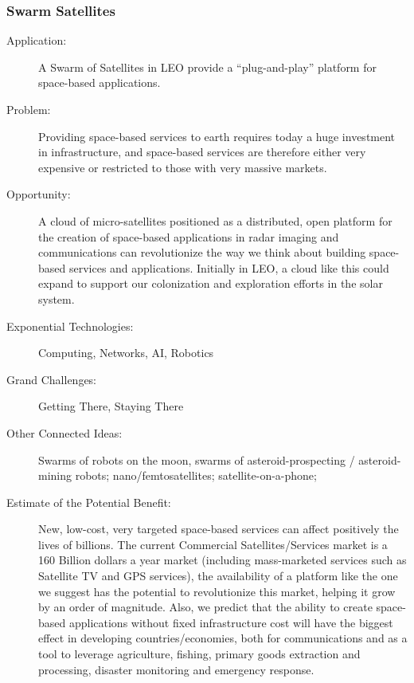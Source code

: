 \subsubsection{Swarm  Satellites}
\label{swarm}
 \begin{description}  \item[Application:] A Swarm of Satellites in \gls{LEO} provide a  ``plug-and-play'' platform for space-based applications.
 
  \item[Problem:] Providing  space-based services to earth requires today a huge investment in  infrastructure, and space-based services are therefore either very  expensive or restricted to those with very massive markets.
 
  \item[Opportunity:] A cloud of  micro-satellites positioned as a distributed, open platform for the  creation of space-based applications in radar imaging and communications can revolutionize the way we think about building space-based services  and applications. Initially in \gls{LEO}, a cloud like this could expand to  support our colonization and exploration efforts in the solar system.
 
  \item[Exponential Technologies:]  Computing, Networks, AI, Robotics
 
  \item[Grand Challenges:] Getting  There, Staying There
 
  \item[Other Connected Ideas:]  Swarms of robots on the moon, swarms of asteroid-prospecting /  asteroid-mining robots; nano/femtosatellites; satellite-on-a-phone;
 
  \item[Estimate of the Potential  Benefit:]New, low-cost, very targeted space-based services can affect  positively the lives of billions. The current Commercial  Satellites/Services market is a 160 Billion dollars a year market  (including mass-marketed services such as Satellite TV and GPS  services), the availability of a platform like the one we suggest has  the potential to revolutionize this market, helping it grow by an order  of magnitude. Also, we predict that the ability to create space-based  applications without fixed infrastructure cost will have the biggest  effect in developing countries/economies, both for communications and as  a tool to leverage agriculture, fishing, primary goods extraction and  processing, disaster monitoring and emergency response.
 

\end{description}
